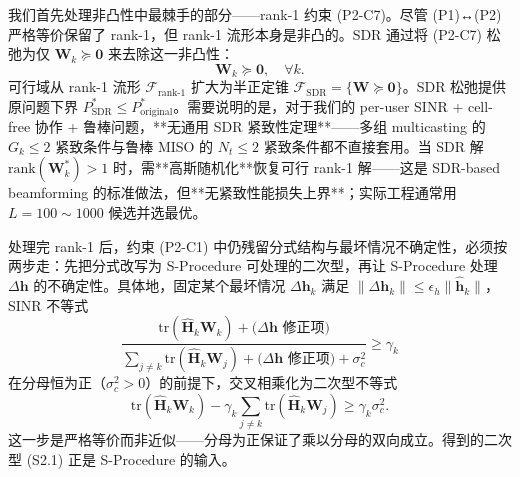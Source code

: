 \documentclass[12pt,a4paper]{article}
\newcommand{\vect}[1]{\mathbf{#1}}
\newcommand{\mat}[1]{\mathbf{#1}}
\newcommand{\tr}{\text{tr}}
\begin{document}
我们首先处理非凸性中最棘手的部分——rank-1 约束 (P2-C7)。尽管 (P1)↔(P2) 严格等价保留了 rank-1，但 rank-1 流形本身是非凸的。SDR 通过将 (P2-C7) 松弛为仅 $\mat{W}_k \succeq \mat{0}$ 来去除这一非凸性：
\begin{equation}
\mat{W}_k \succeq \mat{0}, \quad \forall k. \tag{S1.1}
\end{equation}
可行域从 rank-1 流形 $\mathcal{F}_{\text{rank-1}}$ 扩大为半正定锥 $\mathcal{F}_{\text{SDR}} = \{\mat{W} \succeq \mat{0}\}$。SDR 松弛提供原问题下界 $P_{\text{SDR}}^* \leq P_{\text{original}}^*$。需要说明的是，对于我们的 per-user SINR + cell-free 协作 + 鲁棒问题，**无通用 SDR 紧致性定理**——多组 multicasting 的 $G_k \leq 2$ 紧致条件与鲁棒 MISO 的 $N_t \leq 2$ 紧致条件都不直接套用。当 SDR 解 $\text{rank}(\mat{W}_k^*) > 1$ 时，需**高斯随机化**恢复可行 rank-1 解——这是 SDR-based beamforming 的标准做法，但**无紧致性能损失上界**；实际工程通常用 $L = 100 \sim 1000$ 候选并选最优。

处理完 rank-1 后，约束 (P2-C1) 中仍残留分式结构与最坏情况不确定性，必须按两步走：先把分式改写为 S-Procedure 可处理的二次型，再让 S-Procedure 处理 $\Delta\vect{h}$ 的不确定性。具体地，固定某个最坏情况 $\Delta\vect{h}_k$ 满足 $\|\Delta\vect{h}_k\| \leq \epsilon_h \|\hat{\vect{h}}_k\|$，SINR 不等式
$$
\frac{\tr(\hat{\mat{H}}_k \mat{W}_k) + \text{($\Delta\vect{h}$ 修正项)}}{\sum_{j\neq k} \tr(\hat{\mat{H}}_k \mat{W}_j) + \text{($\Delta\vect{h}$ 修正项)} + \sigma_c^2} \geq \gamma_k
$$
在分母恒为正（$\sigma_c^2 > 0$）的前提下，交叉相乘化为二次型不等式
\begin{equation}
\tr(\hat{\mat{H}}_k \mat{W}_k) - \gamma_k \sum_{j\neq k} \tr(\hat{\mat{H}}_k \mat{W}_j) \geq \gamma_k \sigma_c^2. \tag{S2.1}
\end{equation}
这一步是严格等价而非近似——分母为正保证了乘以分母的双向成立。得到的二次型 (S2.1) 正是 S-Procedure 的输入。
\end{document}

